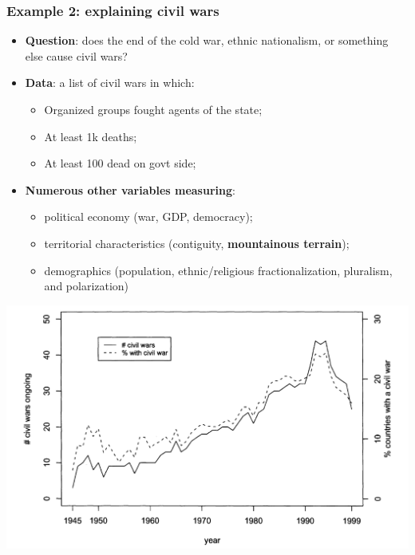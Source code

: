 \documentclass[aspectratio=169]{beamer}
\theoremstyle{principle}
\begin{document}
\begin{frame}
\frametitle{Example 2: explaining civil wars}

\begin{itemize}
\item \textbf{Question}: does the end of the cold war, ethnic nationalism, or something else cause civil wars?
\bigskip
\bigskip
\item \textbf{Data}: a list of civil wars in which:
\begin{itemize}
\item Organized groups fought agents of the state;
\item At least 1k deaths;
\item At least 100 dead on govt side;
\end{itemize}
\bigskip
\item \textbf{Numerous other variables measuring}:
\begin{itemize}
\item political economy (war, GDP, democracy);
\item territorial characteristics (contiguity, \textbf{mountainous terrain});
\item demographics (population, ethnic/religious fractionalization, pluralism, and polarization)
\end{itemize}
\end{itemize}

\end{frame}

\begin{frame}
\begin{center}
\includegraphics[scale=0.65]{f_and_l.png}
\end{center}

\end{frame}
\end{document}
